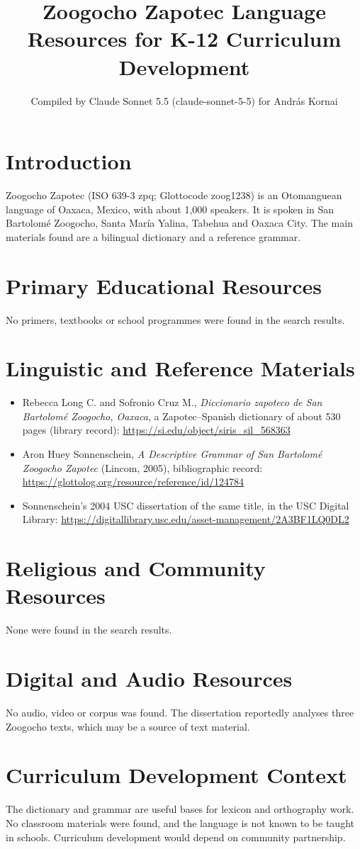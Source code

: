 \documentclass[12pt]{article}
\title{Zoogocho Zapotec Language Resources for K-12 Curriculum Development}
\author{Compiled by Claude Sonnet 5.5 (claude-sonnet-5-5) for Andr\'as Kornai}
\date{}
\begin{document}
\maketitle

\section{Introduction}
Zoogocho Zapotec (ISO 639-3 zpq; Glottocode zoog1238) is an Otomanguean language of Oaxaca, Mexico, with about 1,000 speakers. It is spoken in San Bartolom\'e Zoogocho, Santa Mar\'ia Yalina, Tabehua and Oaxaca City. The main materials found are a bilingual dictionary and a reference grammar.

\section{Primary Educational Resources}
No primers, textbooks or school programmes were found in the search results.

\section{Linguistic and Reference Materials}
\begin{itemize}
\item Rebecca Long C. and Sofronio Cruz M., \emph{Diccionario zapoteco de San Bartolom\'e Zoogocho, Oaxaca}, a Zapotec--Spanish dictionary of about 530 pages (library record): \url{https://si.edu/object/siris_sil_568363}
\item Aron Huey Sonnenschein, \emph{A Descriptive Grammar of San Bartolom\'e Zoogocho Zapotec} (Lincom, 2005), bibliographic record: \url{https://glottolog.org/resource/reference/id/124784}
\item Sonnenschein's 2004 USC dissertation of the same title, in the USC Digital Library: \url{https://digitallibrary.usc.edu/asset-management/2A3BF1LQ0DL2}
\end{itemize}

\section{Religious and Community Resources}
None were found in the search results.

\section{Digital and Audio Resources}
No audio, video or corpus was found. The dissertation reportedly analyses three Zoogocho texts, which may be a source of text material.

\section{Curriculum Development Context}
The dictionary and grammar are useful bases for lexicon and orthography work. No classroom materials were found, and the language is not known to be taught in schools. Curriculum development would depend on community partnership.
\end{document}
